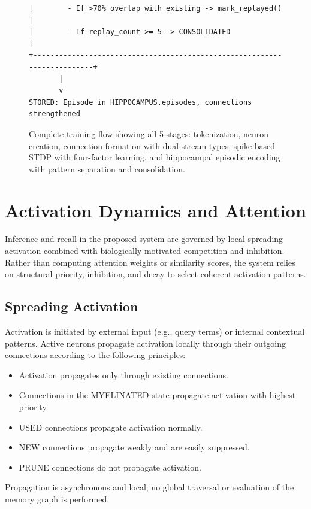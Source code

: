 \documentclass[11pt]{article}
\begin{document}
\begin{figure}[ht]
\begin{Verbatim}[fontsize=\tiny,frame=single]
|        - If >70% overlap with existing -> mark_replayed()               |
|        - If replay_count >= 5 -> CONSOLIDATED                           |
+-------------------------------------------------------------------------+
       |
       v
STORED: Episode in HIPPOCAMPUS.episodes, connections strengthened
\end{Verbatim}
\caption{Complete training flow showing all 5 stages: tokenization, neuron creation, connection formation with dual-stream types, spike-based STDP with four-factor learning, and hippocampal episodic encoding with pattern separation and consolidation.}
\label{fig:training}
\end{figure}

\section{Activation Dynamics and Attention}

Inference and recall in the proposed system are governed by local spreading
activation combined with biologically motivated competition and inhibition.
Rather than computing attention weights or similarity scores, the system relies
on structural priority, inhibition, and decay to select coherent activation
patterns.

\subsection{Spreading Activation}

Activation is initiated by external input (e.g., query terms) or internal
contextual patterns. Active neurons propagate activation locally through their
outgoing connections according to the following principles:

\begin{itemize}
\item Activation propagates only through existing connections.
\item Connections in the MYELINATED state propagate activation with highest
      priority.
\item USED connections propagate activation normally.
\item NEW connections propagate weakly and are easily suppressed.
\item PRUNE connections do not propagate activation.
\end{itemize}

Propagation is asynchronous and local; no global traversal or evaluation of
the memory graph is performed.
\end{document}

